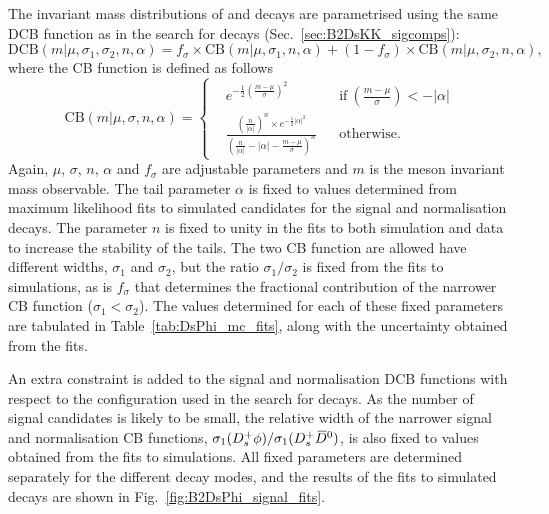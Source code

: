 The invariant mass distributions of \decay{\Bp}{\Dsp\phiz} and \decay{\Bp}{\Dsp\Dzb} decays are parametrised using the same DCB function as in the search for \decay{\Bp}{\Dsp\Kp\Km} decays (Sec.~\ref{sec:B2DsKK_sigcomps}):
\begin{equation}
\text{DCB}(m|\mu,\sigma_1,\sigma_2,n,\alpha) = f_\sigma \times \text{CB}(m|\mu,\sigma_1,n,\alpha) + (1-f_\sigma) \times \text{CB}(m|\mu,\sigma_2,n,\alpha),
\label{eq:DoubleBD}
\end{equation}
where the CB function is defined as follows
\begin{equation}
\text{CB}(m|\mu,\sigma,n,\alpha) = \left \{
  \begin{aligned}
    &e^{-\frac{1}{2} \left(\frac{m-\mu}{\sigma}\right)^2} && \text{if}\ \left(\frac{m-\mu}{\sigma}\right) < -|\alpha|\\
    &\frac{\left(\frac{n}{|\alpha|}\right)^n\times e ^{-\frac{1}{2}|\alpha|^2} }{\left(\frac{n}{|\alpha|}-|\alpha| - \frac{m-\mu}{\sigma}\right)^n} && \text{otherwise.}
  \end{aligned} \right.
\end{equation}
Again, $\mu$, $\sigma$, $n$, $\alpha$ and $f_{\sigma}$ are adjustable parameters and $m$ is the \B meson invariant mass observable.
The tail parameter $\alpha$ is fixed to values determined from maximum likelihood fits to simulated candidates for the signal and normalisation decays. The parameter $n$ is fixed to unity in the fits to both simulation and data to increase the stability of the tails.     
The two CB function are allowed have different widths, $\sigma_{1}$ and $\sigma_{2}$, but the ratio $\sigma_{1}/\sigma_{2}$ is fixed from the fits to simulations, as is $f_{\sigma}$ that determines the fractional contribution of the narrower CB function ($\sigma_{1}<\sigma_{2}$). The values determined for each of these fixed parameters are tabulated in Table~\ref{tab:DsPhi_mc_fits}, along with the uncertainty obtained from the fits.

An extra constraint is added to the signal and normalisation DCB functions with respect to the configuration used in the search for \decay{\Bp}{\Dsp\Kp\Km} decays. As the number of signal candidates is likely to be small, the relative width of the narrower signal and normalisation CB functions, $\sigma_{1}({{D}^+_{s}}\phi) / \sigma_{1}({{D}^+_{s}}{{\kern 0.2em\overline{\kern -0.2em D}{}}{}^0})$, is also fixed to values obtained from the fits to simulations. All fixed parameters are determined separately for the different \Dsp decay modes, and the results of the fits to simulated decays are shown in Fig.~\ref{fig:B2DsPhi_signal_fits}.     


